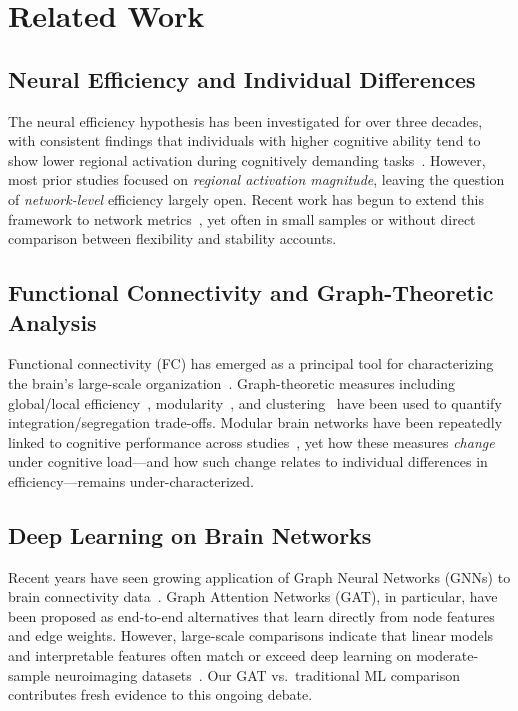 \documentclass[conference]{IEEEtran}
\begin{document}
\section{Related Work}

\subsection{Neural Efficiency and Individual Differences}
The neural efficiency hypothesis has been investigated for over three decades, with consistent findings that individuals with higher cognitive ability tend to show lower regional activation during cognitively demanding tasks~\cite{haier1988cortical,neubauer2009intelligence}. However, most prior studies focused on \emph{regional activation magnitude}, leaving the question of \emph{network-level} efficiency largely open. Recent work has begun to extend this framework to network metrics~\cite{schultz2016higher,shine2016dynamics}, yet often in small samples or without direct comparison between flexibility and stability accounts.

\subsection{Functional Connectivity and Graph-Theoretic Analysis}
Functional connectivity (FC) has emerged as a principal tool for characterizing the brain's large-scale organization~\cite{bassett2017network}. Graph-theoretic measures including global/local efficiency~\cite{latora2001efficient}, modularity~\cite{newman2006modularity}, and clustering~\cite{rubinov2010complex} have been used to quantify integration/segregation trade-offs. Modular brain networks have been repeatedly linked to cognitive performance across studies~\cite{sporns2016modular,bullmore2012economy}, yet how these measures \emph{change} under cognitive load---and how such change relates to individual differences in efficiency---remains under-characterized.

\subsection{Deep Learning on Brain Networks}
Recent years have seen growing application of Graph Neural Networks (GNNs) to brain connectivity data~\cite{velickovic2017graph}. Graph Attention Networks (GAT), in particular, have been proposed as end-to-end alternatives that learn directly from node features and edge weights. However, large-scale comparisons indicate that linear models and interpretable features often match or exceed deep learning on moderate-sample neuroimaging datasets~\cite{schulz2020different}. Our GAT vs.\ traditional ML comparison contributes fresh evidence to this ongoing debate.
\end{document}
